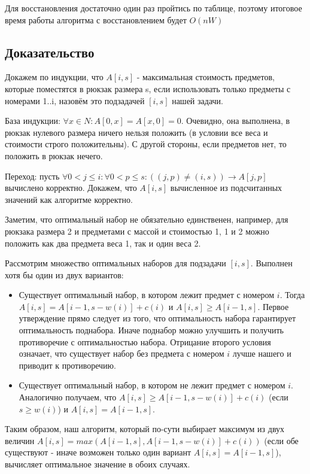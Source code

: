 \documentclass{article}
\begin{document}
Для восстановления достаточно один раз пройтись по таблице, поэтому итоговое время работы алгоритма с восстановлением будет $O(nW)$

\subsection{Доказательство}

Докажем по индукции, что $A[i, s]$ - максимальная стоимость предметов, которые поместятся в рюкзак размера s, если использовать только предметы с номерами 1..i, назовём это подзадачей $[i, s]$ нашей задачи.

База индукции: $\forall x \in N: A[0, x] = A[x, 0] = 0$. Очевидно, она выполнена, в рюкзак нулевого размера ничего нельзя положить (в условии все веса и стоимости строго положительны). С другой стороны, если предметов нет, то положить в рюкзак нечего.

Переход: пусть $\forall 0 < j \leq i: \forall 0 < p \leq s : ((j, p) \neq (i, s)) \rightarrow A[j, p]$ вычислено корректно. Докажем, что $A[i, s]$ вычисленное из подсчитанных значений как алгоритме корректно. 

Заметим, что оптимальный набор не обязательно единственен, например, для рюкзака размера 2 и предметами с массой и стоимостью 1, 1 и 2 можно положить как два предмета веса 1, так и один веса 2. 

Рассмотрим множество оптимальных наборов для подзадачи $[i, s]$. Выполнен хотя бы один из двух вариантов:

\begin{itemize}
	\item Существует оптимальный набор, в котором лежит предмет с номером $i$. Тогда $A[i, s] = A[i - 1, s - w(i)] + c(i)$ и $A[i, s] \geq A[i - 1, s]$. Первое утверждение прямо следует из того, что оптимальность набора гарантирует оптимальность поднабора. Иначе поднабор можно улучшить и получить противоречие с оптимальностью набора. Отрицание второго условия означает, что существует набор без предмета с номером $i$ лучше нашего и приводит к противоречию.
	\item Существует оптимальный набор, в котором не лежит предмет с номером $i$. Аналогично получаем, что $A[i, s] \geq A[i - 1, s - w(i)] + c(i)$ (если $s \geq w(i)$) и $A[i, s] = A[i - 1, s]$.
\end{itemize}

Таким образом, наш алгоритм, который по-сути выбирает максимум из двух величин $A[i, s] = max(A[i - 1, s], A[i - 1, s - w(i)] + c(i))$ (если обе существуют - иначе возможен только один вариант $A[i, s] = A[i - 1, s]$), вычисляет оптимальное значение в обоих случаях. 
\end{document}
